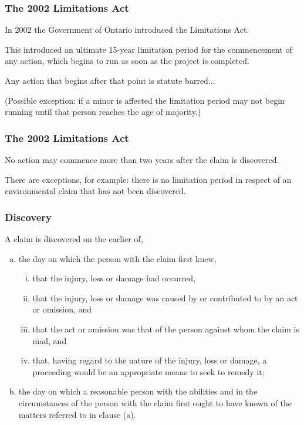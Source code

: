 \begin{frame}
\frametitle{The 2002 Limitations Act}

In 2002 the Government of Ontario introduced the Limitations Act.

This introduced an ultimate 15-year limitation period for the commencement of any action, which begins to run as soon as the project is completed.

Any action that begins after that point is statute barred...

(Possible exception: if a minor is affected the limitation period may not begin running until that person reaches the age of majority.)

\end{frame}



\begin{frame}
\frametitle{The 2002 Limitations Act}

No action may commence more than two years after the claim is discovered.

There are exceptions, for example: there is no limitation period in respect of an environmental claim that has not been discovered.

\end{frame}



\begin{frame}
\frametitle{Discovery}


A claim is discovered on the earlier of,
\begin{enumerate}[(a)]
	\item the day on which the person with the claim first knew,
		\begin{enumerate}[i.]
			\item that the injury, loss or damage had occurred,
			\item that the injury, loss or damage was caused by or contributed to by an act or omission, and
			\item that the act or omission was that of the person against whom the claim is mad, and
			\item that, having regard to the nature of the injury, loss or damage, a proceeding would be an appropriate means to seek to remedy it;
		\end{enumerate}
	\item the day on which a reasonable person with the abilities and in the circumstances of the person with the claim first ought to have known of the matters referred to in clause (a).
\end{enumerate}

\end{frame}



